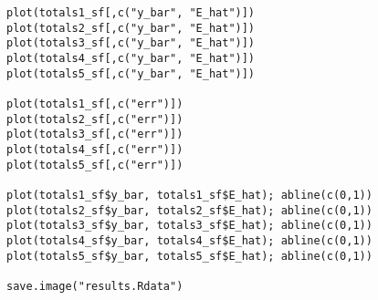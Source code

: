 \documentclass[12pt]{article}
\begin{document}
\begin{scriptsize}
\begin{verbatim}
plot(totals1_sf[,c("y_bar", "E_hat")])
plot(totals2_sf[,c("y_bar", "E_hat")])
plot(totals3_sf[,c("y_bar", "E_hat")])
plot(totals4_sf[,c("y_bar", "E_hat")])
plot(totals5_sf[,c("y_bar", "E_hat")])

plot(totals1_sf[,c("err")])
plot(totals2_sf[,c("err")])
plot(totals3_sf[,c("err")])
plot(totals4_sf[,c("err")])
plot(totals5_sf[,c("err")])

plot(totals1_sf$y_bar, totals1_sf$E_hat); abline(c(0,1))
plot(totals2_sf$y_bar, totals2_sf$E_hat); abline(c(0,1))
plot(totals3_sf$y_bar, totals3_sf$E_hat); abline(c(0,1))
plot(totals4_sf$y_bar, totals4_sf$E_hat); abline(c(0,1))
plot(totals5_sf$y_bar, totals5_sf$E_hat); abline(c(0,1))

save.image("results.Rdata")
\end{verbatim}
\end{scriptsize}
\end{document}

